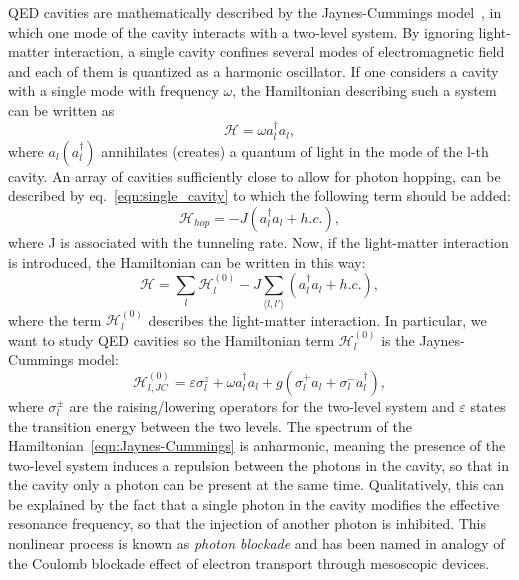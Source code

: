 QED cavities are mathematically described by the Jaynes-Cummings model~\cite{shore_knight}, in which one mode of the cavity interacts with a two-level system. By ignoring light-matter interaction, a single cavity confines several modes of electromagnetic field and each of them is quantized as a harmonic oscillator. If one considers a cavity with a single mode with frequency $\omega$, the Hamiltonian describing such a system can be written as
\begin{equation}
\label{eqn:single_cavity}
    \mathcal{H} = \omega a^{\dagger}_la_l,
\end{equation}
where $a_l (a_l^{\dagger})$ annihilates (creates) a quantum of light in the mode of the l-th cavity.
An array of cavities sufficiently close to allow for photon hopping, can be described by eq.~\ref{eqn:single_cavity} to which the following term should be added:
\begin{equation*}
    \mathcal{H}_{hop} = -J (a^{\dagger}_la_l + h.c.),
\end{equation*}
where J is associated with the tunneling rate.
Now, if the light-matter interaction is introduced, the Hamiltonian can be written in this way:
\begin{equation}
    \mathcal{H} = \sum_l \mathcal{H}_l^{(0)} - J \sum_{\langle l, l' \rangle}(a^{\dagger}_la_l + h.c.),
\end{equation}
where the term $\mathcal{H}_l^{(0)}$ describes the light-matter interaction. In particular, we want to study QED cavities so the Hamiltonian term $\mathcal{H}_l^{(0)}$ is the Jaynes-Cummings model:
\begin{equation}
\label{eqn:Jaynes-Cummings}
    \mathcal{H}_{l,JC}^{(0)} = \varepsilon \sigma^z_l + \omega a^{\dagger}_la_l + g(\sigma^+_l a_l + \sigma^-_l a_l^{\dagger}),
\end{equation}
where $\sigma^\pm_l$ are the raising/lowering operators for the two-level system and $\varepsilon$ states the transition energy between the two levels.
The spectrum of the Hamiltonian~\ref{eqn:Jaynes-Cummings} is anharmonic, meaning the presence of the two-level system induces a repulsion between the photons in the cavity, so that in the cavity only a photon can be present at the same time. Qualitatively, this can be explained by the fact that a single photon in the cavity modifies the effective resonance frequency, so that the injection of another photon is inhibited. This nonlinear process is known as \emph{photon blockade} and has been named in analogy of the Coulomb blockade effect of electron transport through mesoscopic devices.

